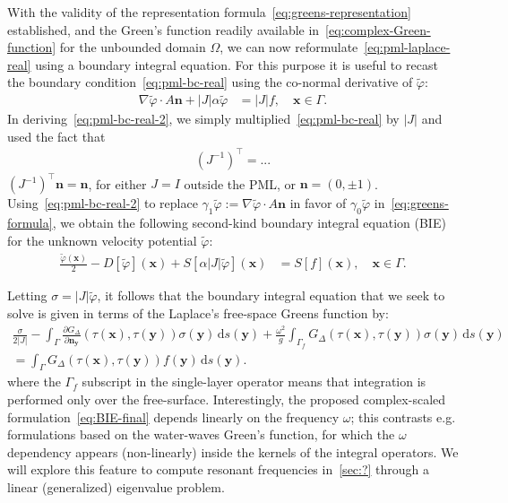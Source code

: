 \documentclass[11pt]{article}
\newcommand{\bn}{\mathbf{n}}
\newcommand{\bx}{\mathbf{x}}
\newcommand{\by}{\mathbf{y}}
\newcommand{\de}{\,\mathrm{d}}
\newcommand{\tvarphi}{\tilde \varphi}
\begin{document}
With the validity of the representation formula~\cref{eq:greens-representation}
established, and the Green's function readily available
in~\cref{eq:complex-Green-function} for the unbounded domain $\Omega$, we can
now reformulate~\cref{eq:pml-laplace-real} using a boundary integral equation.
For this purpose it is useful to recast the boundary
condition~\cref{eq:pml-bc-real} using the co-normal derivative of $\tvarphi$:
\begin{align}
  \label{eq:pml-bc-real-2}
  \nabla \tvarphi \cdot A\bn + |J| \alpha \tvarphi &= |J| f, \quad \bx \in \Gamma.
\end{align}
In deriving~\cref{eq:pml-bc-real-2}, we simply multiplied~\cref{eq:pml-bc-real}
by $|J|$ and used the fact that 
\begin{align}
  (J^{-1})^\top = ...
\end{align}
$(J^{-1})^\top \bn = \bn$, for either $J = I$
outside the PML, or
$\bn = (0, \pm 1)$. Using~\cref{eq:pml-bc-real-2} to replace $\gamma_1\tvarphi
:= \nabla \tvarphi \cdot A \bn$ in favor of $\gamma_0 \tvarphi$
in~\cref{eq:greens-formula}, we obtain the following second-kind boundary
integral equation (BIE) for the unknown velocity potential $\tvarphi$:
\begin{align}
  \label{eq:BIE}
  \frac{\tvarphi(\bx)}{2} - D[\tvarphi](\bx) + S\left[\alpha\left|J\right|\tvarphi\right](\bx) &= S[f](\bx), \quad \bx \in \Gamma.
\end{align}

Letting $\sigma = |J|\tvarphi$, it follows that the boundary integral equation
that we seek to solve is given in terms of the Laplace's free-space Greens
function by:
\begin{align}
  \label{eq:BIE-final}  
  \frac{\sigma}{2|J|} - \int_\Gamma \frac{\partial G_{\Delta}}{\partial \bn_\by}(\tau(\bx),\tau(\by)) \sigma(\by) \de s(\by) + \frac{\omega^2}{g}\int_{\Gamma_f} G_{\Delta}(\tau(\bx),\tau(\by)) \sigma(\by) \de s(\by) \\
  = \int_{\Gamma} G_{\Delta}(\tau(\bx),\tau(\by)) f(\by) \de s(\by). \nonumber
\end{align}
where the $\Gamma_f$ subscript in the single-layer operator means that
integration is performed only over the free-surface. Interestingly, the proposed
complex-scaled formulation~\cref{eq:BIE-final} depends linearly on the frequency
$\omega$; this contrasts e.g. formulations based on the water-waves Green's
function, for which the $\omega$ dependency appears (non-linearly) inside the
kernels of the integral operators. We will explore this feature to compute
resonant frequencies in~\cref{sec:?} through a linear (generalized) eigenvalue
problem.
\end{document}
